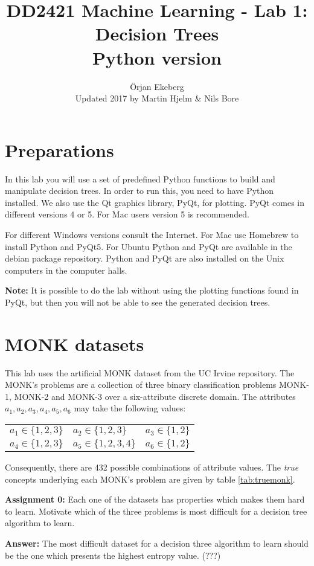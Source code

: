 \documentclass[11pt]{article}
\title{\vspace{-5.0cm}DD2421 Machine Learning - Lab 1: Decision Trees \\ Python version}
\author{\"Orjan Ekeberg\\ Updated 2017 by Martin Hjelm \& Nils Bore }
\begin{document}
\maketitle

\section{Preparations}

In this lab you will use a set of predefined Python functions to
build and manipulate decision trees.  In order to run this, you
need to have Python installed.  We also use the Qt graphics library,
PyQt, for plotting. PyQt comes in different versions 4 or 5. For
Mac users version 5 is recommended. 

For different Windows versions consult the Internet. For Mac use Homebrew 
to install Python and PyQt5. For Ubuntu Python and PyQt are available in the 
debian package repository. Python and PyQt are also installed on the Unix computers in 
the computer halls.

\textbf{Note:} It is possible to do the lab without using the
plotting functions found in PyQt, but then you will not be able to see the generated
decision trees.


\section{MONK datasets}

This lab uses the artificial MONK dataset from the UC Irvine repository.
The MONK's problems are a collection of three binary classification
problems MONK-1, MONK-2 and MONK-3 over a six-attribute discrete domain.
The attributes \(a_1, a_2, a_3, a_4, a_5, a_6\) may take the following values:

\begin{center}
  \begin{tabular}{lll}
    \(a_1 \in \{1, 2, 3\}\) &
    \(a_2 \in \{1, 2, 3\}\) &
    \(a_3 \in \{1, 2\}\)\\
    \(a_4 \in \{1, 2, 3\}\) &
    \(a_5 \in \{1, 2, 3, 4\}\) &
    \(a_6 \in \{1, 2\}\)\\
  \end{tabular}
\end{center}
Consequently, there are 432 possible combinations of attribute values. 
The \emph{true} concepts underlying each MONK's problem are given by
table \ref{tab:truemonk}.

\begin{tcolorbox}
\textbf{Assignment 0:}
Each one of the datasets has properties which makes them hard to learn.
Motivate which of the three problems is most difficult for a decision
tree algorithm to learn.

\textbf{Answer:}
The most difficult dataset for a decision three algorithm to learn should be the one which presents the highest entropy value. (???)
\end{tcolorbox}
\end{document}
